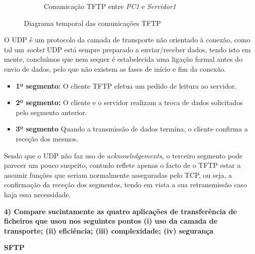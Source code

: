 \begin{figure}
\begin{subfigure}[b]{0.4\textwidth}
                 \caption*{Comunicação TFTP entre \textit{PC1} e \textit{Servidor1}}
             \end{subfigure}
             \caption{Diagrama temporal das comunicações TFTP}
             \vspace{-10pt}
        \end{figure}

        O UDP é um protocolo da camada de transporte não orientado à conexão, como tal um \textit{socket} UDP está sempre preparado a enviar/receber dados, tendo isto em mente, concluímos que nem sequer é estabelecida uma ligação formal antes do envio de dados, pelo que não existem as fases de início e fim da conexão.

        \begin{itemize}
            \item \textbf{1º segmento:} O  cliente TFTP efetua um pedido de leitura ao servidor.

            \item \textbf{2º segmento:} O cliente e o servidor realizam a troca de dados solicitados pelo segmento anterior.

            \item \textbf{3º segmento} Quando a transmissão de dados termina, o cliente confirma a receção dos mesmos.
        \end{itemize}

        Sendo que o UDP não faz uso de \textit{acknowledgements,} o terceiro segmento pode parecer um pouco suspeito, contudo reflete apenas o facto de o TFTP estar a assumir funções que seriam normalmente asseguradas pelo TCP, ou seja, a confirmação da receção dos segmentos, tendo em vista a sua retransmissão caso haja essa necessidade.

        \textbf{4) Compare sucintamente as quatro aplicações de transferência de ficheiros que usou nos seguintes pontos (i) uso da camada de transporte; (ii) eficiência; (iii) complexidade; (iv) segurança}

        \vspace{5pt}
        \textbf{\large SFTP}
        
